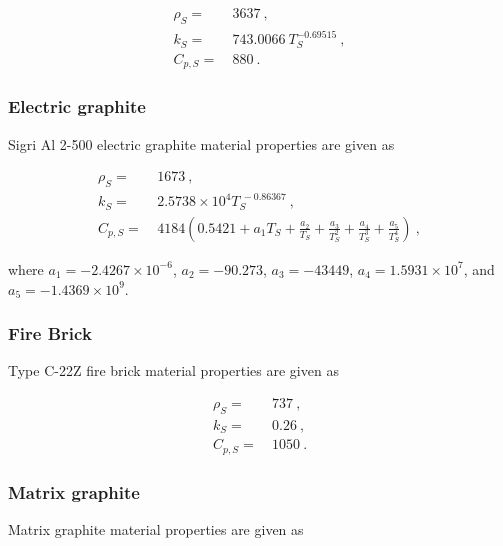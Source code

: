 \begin{appendices}
\begin{subequations}
\begin{align}
\rho_S=&\ 3637\ ,\\
k_S=&\ 743.0066\ T_S^{-0.69515}\ , \\
C_{p,S}=&\ 880\ .
\end{align}
\end{subequations}


\subsubsection*{Electric graphite}
Sigri Al 2-500 electric graphite material properties are given as \cite{SANA,butland}

\begin{subequations}
\begin{align}
\rho_S=&\ 1673\ ,\\
\label{eq:k_eg}
k_S =&\ 2.5738\times10^4T_S^{\ -0.86367}\ , \\
\label{eq:Butland_cp}
C_{p,S} =&\ 4184\left(0.5421+a_1T_S+\frac{a_2}{T_S}+\frac{a_3}{T_S^2}+\frac{a_4}{T_S^3}+\frac{a_5}{T_S^4}\right)\ ,
\end{align}
\end{subequations}

\noindent where \(a_1=-2.4267\times10^{-6}\), \(a_2=-90.273\), \(a_3=-43449\), \(a_4=1.5931\times10^7\), and \(a_5=-1.4369\times10^9\).


\subsubsection*{Fire Brick}
Type C-22Z fire brick material properties are given as \cite{firebrick,firebrick2}

\begin{subequations}
\begin{align}
\rho_S=&\ 737\ ,\\
\label{eq:k_mg}
k_S=&\ 0.26\ , \\
\label{eq:Butland_cp2}
C_{p,S} =&\ 1050\ .
\end{align}
\end{subequations}

\subsubsection*{Matrix graphite}
Matrix graphite material properties are given as \cite{SANA,butland}


\end{appendices}
